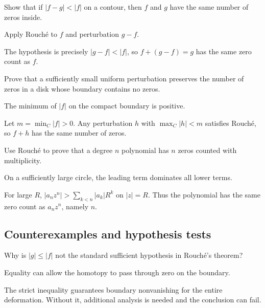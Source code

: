 \begin{exercise}\label{exr:iv13-expand-07}
Show that if \(|f-g|<|f|\) on a contour, then \(f\) and \(g\) have the same number of zeros inside.
\end{exercise}
\begin{hint}
Apply Rouché to \(f\) and perturbation \(g-f\).
\end{hint}
\begin{solution}
The hypothesis is precisely \(|g-f|<|f|\), so \(f+(g-f)=g\) has the same zero count as \(f\).
\end{solution}

\begin{exercise}\label{exr:iv13-expand-08}
Prove that a sufficiently small uniform perturbation preserves the number of zeros in a disk whose boundary contains no zeros.
\end{exercise}
\begin{hint}
The minimum of \(|f|\) on the compact boundary is positive.
\end{hint}
\begin{solution}
Let \(m=\min_C|f|>0\). Any perturbation \(h\) with \(\max_C|h|<m\) satisfies Rouché, so \(f+h\) has the same number of zeros.
\end{solution}

\begin{exercise}\label{exr:iv13-expand-09}
Use Rouché to prove that a degree \(n\) polynomial has \(n\) zeros counted with multiplicity.
\end{exercise}
\begin{hint}
On a sufficiently large circle, the leading term dominates all lower terms.
\end{hint}
\begin{solution}
For large \(R\), \(|a_n z^n|>\sum_{k<n}|a_k|R^k\) on \(|z|=R\). Thus the polynomial has the same zero count as \(a_n z^n\), namely \(n\).
\end{solution}

\subsection*{Counterexamples and hypothesis tests}

\begin{exercise}\label{exr:iv13-expand-10}
Why is \(|g|\le|f|\) not the standard sufficient hypothesis in Rouché's theorem?
\end{exercise}
\begin{hint}
Equality can allow the homotopy to pass through zero on the boundary.
\end{hint}
\begin{solution}
The strict inequality guarantees boundary nonvanishing for the entire deformation. Without it, additional analysis is needed and the conclusion can fail.
\end{solution}

